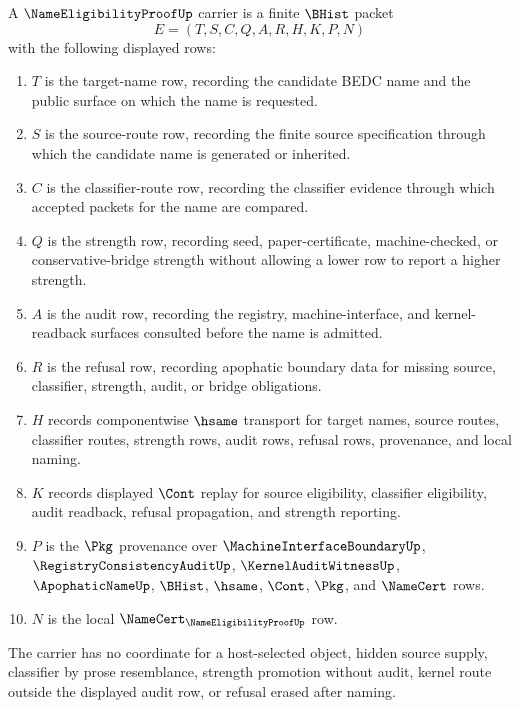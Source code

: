 \begin{definition}
\label{def:name-eligibility-proof-carrier}
A $\NameEligibilityProofUp$ carrier is a finite $\BHist$ packet
$$
E=(T,S,C,Q,A,R,H,K,P,N)
$$
with the following displayed rows:
\begin{enumerate}
\item $T$ is the target-name row, recording the candidate BEDC name and the public surface on which the name is requested.
\item $S$ is the source-route row, recording the finite source specification through which the candidate name is generated or inherited.
\item $C$ is the classifier-route row, recording the classifier evidence through which accepted packets for the name are compared.
\item $Q$ is the strength row, recording seed, paper-certificate, machine-checked, or conservative-bridge strength without allowing a lower row to report a higher strength.
\item $A$ is the audit row, recording the registry, machine-interface, and kernel-readback surfaces consulted before the name is admitted.
\item $R$ is the refusal row, recording apophatic boundary data for missing source, classifier, strength, audit, or bridge obligations.
\item $H$ records componentwise $\hsame$ transport for target names, source routes, classifier routes, strength rows, audit rows, refusal rows, provenance, and local naming.
\item $K$ records displayed $\Cont$ replay for source eligibility, classifier eligibility, audit readback, refusal propagation, and strength reporting.
\item $P$ is the $\Pkg$ provenance over $\MachineInterfaceBoundaryUp$, $\RegistryConsistencyAuditUp$, $\KernelAuditWitnessUp$, $\ApophaticNameUp$, $\BHist$, $\hsame$, $\Cont$, $\Pkg$, and $\NameCert$ rows.
\item $N$ is the local $\NameCert_{\NameEligibilityProofUp}$ row.
\end{enumerate}
The carrier has no coordinate for a host-selected object, hidden source supply, classifier by prose resemblance, strength promotion without audit, kernel route outside the displayed audit row, or refusal erased after naming.
\end{definition}

